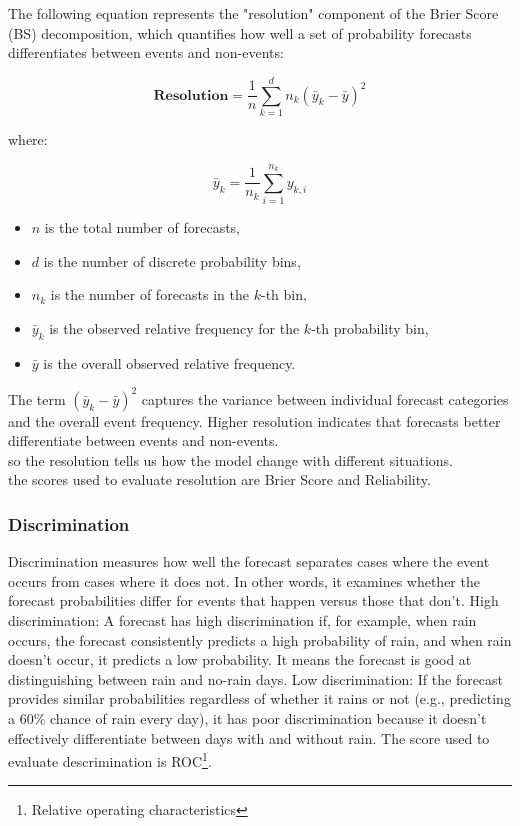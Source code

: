 The following equation represents the "resolution" component of the Brier Score (BS) decomposition, which quantifies how well a set of probability forecasts differentiates between events and non-events:

\begin{equation}
\textbf {Resolution} = \frac{1}{n} \sum_{k=1}^{d} n_k \left( \bar{y}_k - \bar{y} \right)^2
\end{equation}

where:

\begin{equation}
\bar{y}_k = \frac{1}{n_k} \sum_{i=1}^{n_k} y_{k,i}
\end{equation}

\begin{itemize}
    \item $n$ is the total number of forecasts,
    \item $d$ is the number of discrete probability bins,
    \item $n_k$ is the number of forecasts in the $k$-th bin,
    \item $\bar{y}_k$ is the observed relative frequency for the $k$-th probability bin,
    \item $\bar{y}$ is the overall observed relative frequency.
\end{itemize}

The term $\left( \bar{y}_k - \bar{y} \right)^2$ captures the variance between individual forecast categories and the overall event frequency. Higher resolution indicates that forecasts better differentiate between events and non-events.\\
so the resolution tells us how the model change with different situations.\\
the scores used to evaluate resolution are Brier Score and Reliability.



		\subsubsection{Discrimination}

Discrimination measures how well the forecast separates cases where the event occurs from cases where it does not. In other words, it examines whether the forecast probabilities differ for events that happen versus those that don't.
High discrimination: A forecast has high discrimination if, for example, when rain occurs, the forecast consistently predicts a high probability of rain, and when rain doesn’t occur, it predicts a low probability. It means the forecast is good at distinguishing between rain and no-rain days.
Low discrimination: If the forecast provides similar probabilities regardless of whether it rains or not (e.g., predicting a 60\% chance of rain every day), it has poor discrimination because it doesn’t effectively differentiate between days with and without rain. The score used to evaluate descrimination is ROC\footnote{Relative operating characteristics}.
